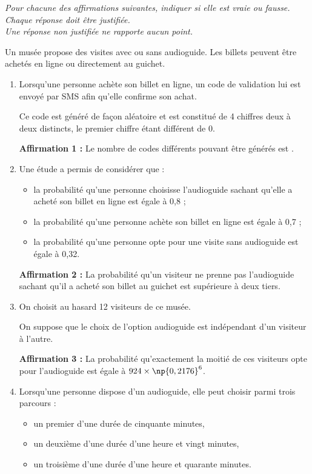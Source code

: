 \medskip

\emph{Pour chacune des affirmations suivantes, indiquer si elle est vraie ou fausse.\\
 Chaque réponse doit être justifiée.\\
 Une réponse non justifiée ne rapporte aucun point.}

\medskip

Un musée propose des visites avec ou sans audioguide. Les billets peuvent être achetés en ligne ou directement au guichet.

\medskip

\begin{enumerate}
\item Lorsqu'une personne achète son billet en ligne, un code de validation lui est envoyé par SMS afin qu'elle confirme son achat.

Ce code est généré de façon aléatoire et est constitué de 4 chiffres deux à deux distincts, le premier chiffre étant différent de 0.

\medskip

\textbf{Affirmation 1 :} Le nombre de codes différents pouvant être générés est .
\item Une étude a permis de considérer que :
\begin{itemize}
\item la probabilité qu'une personne choisisse l'audioguide sachant qu'elle a acheté
son billet en ligne est égale à 0,8 ;
\item la probabilité qu'une personne achète son billet en ligne est égale à 0,7 ;
\item la probabilité qu'une personne opte pour une visite sans audioguide
est égale à 0,32.
\end{itemize}

\medskip

\textbf{Affirmation 2 :} La probabilité qu'un visiteur ne prenne pas l'audioguide
sachant qu'il a acheté son billet au guichet est supérieure à deux tiers.
\item On choisit au hasard 12 visiteurs de ce musée.

On suppose que le choix de l'option \og audioguide \fg{} est indépendant d'un visiteur à l'autre.

\medskip

\textbf{Affirmation 3 :} La probabilité qu'exactement la moitié de ces visiteurs opte pour l'audioguide est égale à $924 \times \np{0,2176}^6$.

\item Lorsqu'une personne dispose d'un audioguide, elle peut choisir parmi trois parcours :
\begin{itemize}
\item un premier d'une durée de cinquante minutes,
\item un deuxième d'une durée d'une heure et vingt minutes,
\item un troisième d'une durée d'une heure et quarante minutes.
\end{itemize}


\end{enumerate}
